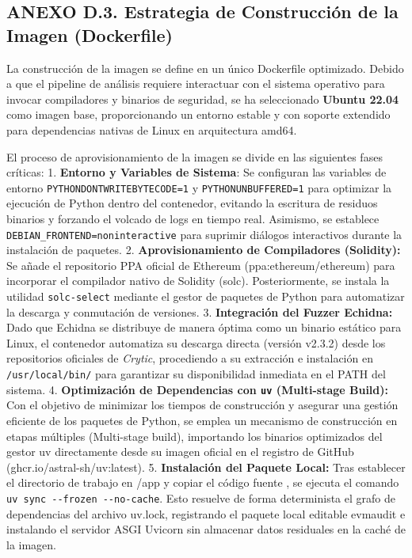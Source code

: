 \subsection{ANEXO D.3. Estrategia de Construcción de la Imagen
(Dockerfile)}\label{anexo-d.3.-estrategia-de-construcciuxf3n-de-la-imagen-dockerfile}

La construcción de la imagen se define en un único Dockerfile
optimizado. Debido a que el pipeline de análisis requiere interactuar
con el sistema operativo para invocar compiladores y binarios de
seguridad, se ha seleccionado \textbf{Ubuntu 22.04} como imagen base,
proporcionando un entorno estable y con soporte extendido para
dependencias nativas de Linux en arquitectura amd64.

El proceso de aprovisionamiento de la imagen se divide en las siguientes
fases críticas: 1. \textbf{Entorno y Variables de Sistema}: Se
configuran las variables de entorno \texttt{PYTHONDONTWRITEBYTECODE=1} y
\texttt{PYTHONUNBUFFERED=1} para optimizar la ejecución de Python dentro
del contenedor, evitando la escritura de residuos binarios y forzando el
volcado de logs en tiempo real. Asimismo, se establece
\texttt{DEBIAN\_FRONTEND=noninteractive} para suprimir diálogos
interactivos durante la instalación de paquetes. 2.
\textbf{Aprovisionamiento de Compiladores (Solidity):} Se añade el
repositorio PPA oficial de Ethereum (ppa:ethereum/ethereum) para
incorporar el compilador nativo de Solidity (solc). Posteriormente, se
instala la utilidad \texttt{solc-select} mediante el gestor de paquetes
de Python para automatizar la descarga y conmutación de versiones. 3.
\textbf{Integración del Fuzzer Echidna:} Dado que Echidna se distribuye
de manera óptima como un binario estático para Linux, el contenedor
automatiza su descarga directa (versión v2.3.2) desde los repositorios
oficiales de \emph{Crytic}, procediendo a su extracción e instalación en
\texttt{/usr/local/bin/} para garantizar su disponibilidad inmediata en
el PATH del sistema. 4. \textbf{Optimización de Dependencias con
\texttt{uv} (Multi-stage Build):} Con el objetivo de minimizar los
tiempos de construcción y asegurar una gestión eficiente de los paquetes
de Python, se emplea un mecanismo de construcción en etapas múltiples
(Multi-stage build), importando los binarios optimizados del gestor uv
directamente desde su imagen oficial en el registro de GitHub
(ghcr.io/astral-sh/uv:latest). 5. \textbf{Instalación del Paquete
Local:} Tras establecer el directorio de trabajo en /app y copiar el
código fuente , se ejecuta el comando
\texttt{uv\ sync\ -\/-frozen\ -\/-no-cache}. Esto resuelve de forma
determinista el grafo de dependencias del archivo uv.lock, registrando
el paquete local editable evmaudit e instalando el servidor ASGI Uvicorn
sin almacenar datos residuales en la caché de la imagen.

